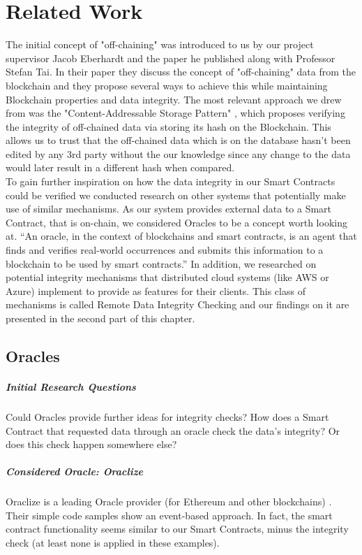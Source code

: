\section{Related Work}

The initial concept of "off-chaining" was introduced to us by our project supervisor Jacob Eberhardt and the paper he published along with Professor Stefan Tai.
In their paper they discuss the concept of "off-chaining" data from the blockchain and they propose several ways to achieve this while maintaining Blockchain properties and data integrity. The most relevant approach we drew from was the "Content-Addressable Storage Pattern" \cite{Eberhardt2017}, which proposes verifying the integrity of off-chained data via storing its hash on the Blockchain. This allows us to trust that the off-chained data which is on the database hasn't been edited by any 3rd party without the our knowledge since any change to the data would later result in a different hash when compared\cite{Eberhardt2017}.\\

To gain further inspiration on how the data integrity in our Smart Contracts could be verified we conducted research on other systems that potentially make use of similar mechanisms. As our system provides external data to a Smart Contract, that is on-chain, we considered Oracles to be a concept worth looking at. “An oracle, in the context of blockchains and smart contracts, is an agent that finds and verifies real-world occurrences and submits this information to a blockchain to be used by smart contracts.” \cite{relatedWork01} In addition, we researched on potential integrity mechanisms that distributed cloud systems (like AWS or Azure) implement to provide as features for their clients. This class of mechanisms is called Remote Data Integrity Checking and our findings on it are presented in the second part of this chapter.

\subsection{Oracles}

\subparagraph{Initial Research Questions}
Could Oracles provide further ideas for integrity checks? How does a Smart Contract that requested data through an oracle check the data’s integrity? Or does this check happen somewhere else?

\subparagraph{Considered Oracle: Oraclize}
Oraclize is a leading Oracle provider (for Ethereum and other blockchains) \cite{relatedWork02}. Their simple code samples \cite{relatedWork03} show an event-based approach. In fact, the smart contract functionality seems similar to our Smart Contracts, minus the integrity check (at least none is applied in these examples).

